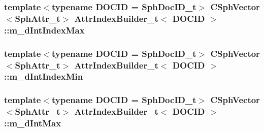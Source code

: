 \hypertarget{classAttrIndexBuilder__t_a5fcd007cce05f4aedab96831c85fc1cb}{
\subsubsection[{m\-\_\-d\-Int\-Index\-Max}]{\setlength{\rightskip}{0pt plus 5cm}template$<$typename D\-O\-C\-I\-D  = Sph\-Doc\-I\-D\-\_\-t$>$ {\bf C\-Sph\-Vector}$<${\bf Sph\-Attr\-\_\-t}$>$ {\bf Attr\-Index\-Builder\-\_\-t}$<$ D\-O\-C\-I\-D $>$\-::m\-\_\-d\-Int\-Index\-Max\hspace{0.3cm}{\ttfamily [private]}}}\label{classAttrIndexBuilder__t_a5fcd007cce05f4aedab96831c85fc1cb}
\hypertarget{classAttrIndexBuilder__t_aa12e412aa68109a80bf563b01c030444}{
\subsubsection[{m\-\_\-d\-Int\-Index\-Min}]{\setlength{\rightskip}{0pt plus 5cm}template$<$typename D\-O\-C\-I\-D  = Sph\-Doc\-I\-D\-\_\-t$>$ {\bf C\-Sph\-Vector}$<${\bf Sph\-Attr\-\_\-t}$>$ {\bf Attr\-Index\-Builder\-\_\-t}$<$ D\-O\-C\-I\-D $>$\-::m\-\_\-d\-Int\-Index\-Min\hspace{0.3cm}{\ttfamily [private]}}}\label{classAttrIndexBuilder__t_aa12e412aa68109a80bf563b01c030444}
\hypertarget{classAttrIndexBuilder__t_aa08e50525c47ead7e28a304929fd0163}{
\subsubsection[{m\-\_\-d\-Int\-Max}]{\setlength{\rightskip}{0pt plus 5cm}template$<$typename D\-O\-C\-I\-D  = Sph\-Doc\-I\-D\-\_\-t$>$ {\bf C\-Sph\-Vector}$<${\bf Sph\-Attr\-\_\-t}$>$ {\bf Attr\-Index\-Builder\-\_\-t}$<$ D\-O\-C\-I\-D $>$\-::m\-\_\-d\-Int\-Max\hspace{0.3cm}{\ttfamily [private]}}}\label{classAttrIndexBuilder__t_aa08e50525c47ead7e28a304929fd0163}
